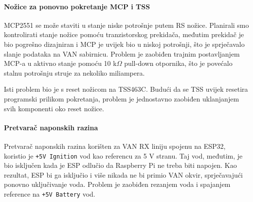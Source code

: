 \paragraph{Nožice za ponovno pokretanje MCP i TSS}
MCP2551 se može staviti u stanje niske potrošnje putem RS nožice. 
Planirali smo kontrolirati stanje nožice pomoću tranzistorskog prekidača, međutim prekidač je bio pogrešno dizajniran i MCP je uvijek bio u niskoj potrošnji, 
što je sprječavalo slanje podataka na VAN sabirnicu. 
Problem je zaobiđen trajnim postavljanjem MCP-a u aktivno stanje pomoću 10 k$\Omega$ pull-down otpornika, 
što je povećalo stalnu potrošnju struje za nekoliko miliampera.

\bigskip
\noindent
Isti problem bio je s reset nožicom na TSS463C. 
Budući da se TSS uvijek resetira programski prilikom pokretanja, problem je jednostavno zaobiđen uklanjanjem svih komponenti oko reset nožice.

\paragraph{Pretvarač naponskih razina}
Pretvarač naponskih razina korišten za VAN RX liniju spojenu na ESP32, koristio je \texttt{+5V Ignition} vod kao referencu za 5 V stranu. 
Taj vod, međutim, je bio isključen kada je ESP odlučio da Raspberry Pi ne treba biti napojen. 
Kao rezultat, ESP bi ga isključio i više nikada ne bi primio VAN okvir, sprječavajući ponovno uključivanje voda. 
Problem je zaobiđen rezanjem voda i spajanjem reference na \texttt{+5V Battery} vod.
